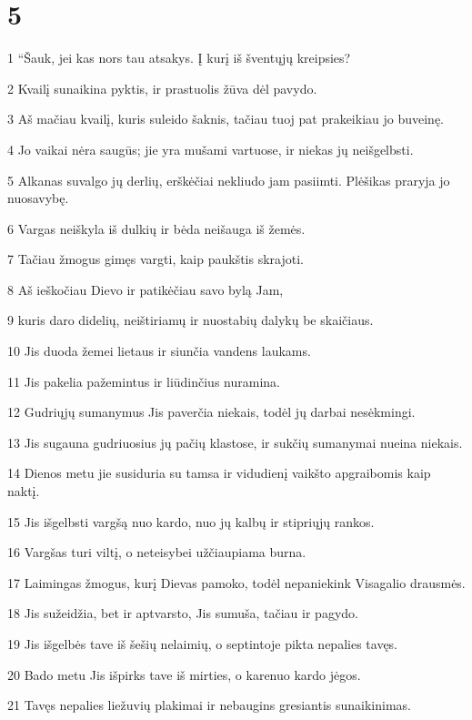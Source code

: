\chapter{5}


\par 1 “Šauk, jei kas nors tau atsakys. Į kurį iš šventųjų kreipsies? 
\par 2 Kvailį sunaikina pyktis, ir prastuolis žūva dėl pavydo. 
\par 3 Aš mačiau kvailį, kuris suleido šaknis, tačiau tuoj pat prakeikiau jo buveinę. 
\par 4 Jo vaikai nėra saugūs; jie yra mušami vartuose, ir niekas jų neišgelbsti. 
\par 5 Alkanas suvalgo jų derlių, erškėčiai nekliudo jam pasiimti. Plėšikas praryja jo nuosavybę. 
\par 6 Vargas neiškyla iš dulkių ir bėda neišauga iš žemės. 
\par 7 Tačiau žmogus gimęs vargti, kaip paukštis skrajoti. 
\par 8 Aš ieškočiau Dievo ir patikėčiau savo bylą Jam, 
\par 9 kuris daro didelių, neištiriamų ir nuostabių dalykų be skaičiaus. 
\par 10 Jis duoda žemei lietaus ir siunčia vandens laukams. 
\par 11 Jis pakelia pažemintus ir liūdinčius nuramina. 
\par 12 Gudriųjų sumanymus Jis paverčia niekais, todėl jų darbai nesėkmingi. 
\par 13 Jis sugauna gudriuosius jų pačių klastose, ir sukčių sumanymai nueina niekais. 
\par 14 Dienos metu jie susiduria su tamsa ir vidudienį vaikšto apgraibomis kaip naktį. 
\par 15 Jis išgelbsti vargšą nuo kardo, nuo jų kalbų ir stipriųjų rankos. 
\par 16 Vargšas turi viltį, o neteisybei užčiaupiama burna. 
\par 17 Laimingas žmogus, kurį Dievas pamoko, todėl nepaniekink Visagalio drausmės. 
\par 18 Jis sužeidžia, bet ir aptvarsto, Jis sumuša, tačiau ir pagydo. 
\par 19 Jis išgelbės tave iš šešių nelaimių, o septintoje pikta nepalies tavęs. 
\par 20 Bado metu Jis išpirks tave iš mirties, o kare­nuo kardo jėgos. 
\par 21 Tavęs nepalies liežuvių plakimai ir nebaugins gresiantis sunaikinimas. 
